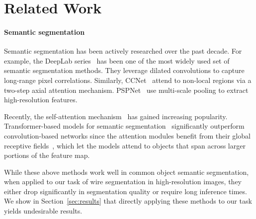 \section{Related Work} \label{sec:related}





\paragraph{Semantic segmentation}
Semantic segmentation has been actively researched over the past decade. For example, the DeepLab series~\cite{deeplab, deeplabv3, deeplabv3p} has been one of the most widely used set of semantic segmentation methods. They leverage dilated convolutions to capture long-range pixel correlations. Similarly, CCNet~\cite{ccnet} attend to non-local regions via a two-step axial attention mechanism. PSPNet~\cite{pspnet} use multi-scale pooling to extract high-resolution features.

Recently, the self-attention mechanism~\cite{attention} has gained increasing popularity. 
Transformer-based models for semantic segmentation~\cite{dpt, setr, swin, segformer, hassani2022neighborhood, hassani2022dilated, jain2021semask, jain2022oneformer} significantly outperform convolution-based networks since the attention modules benefit from their global receptive fields~\cite{segformer}, which let the models attend to objects that span across larger portions of the feature map.

While these above methods work well in common object semantic segmentation, when applied to our task of wire segmentation in high-resolution images, they either drop significantly in segmentation quality or require long inference times. We show in Section~\ref{sec:results} that directly applying these methods to our task yields undesirable results.

